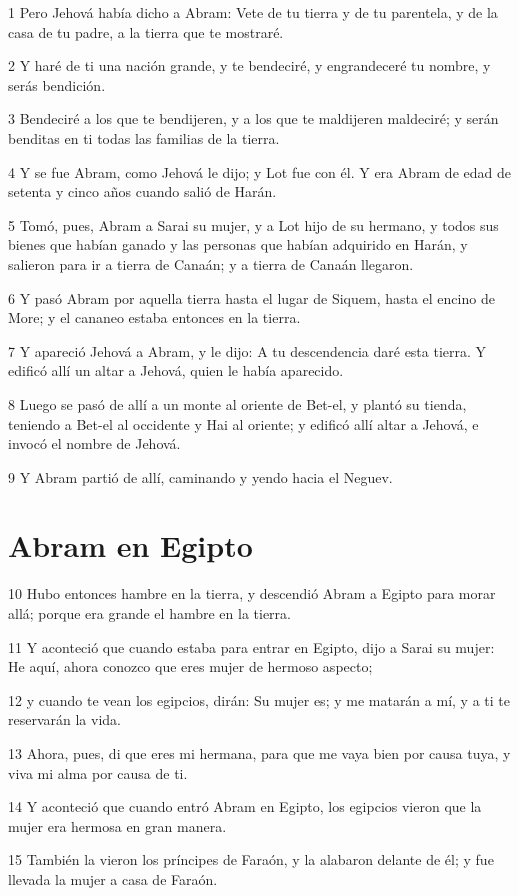 1 Pero Jehová había dicho a Abram: Vete de tu tierra y de tu parentela, y de la casa de tu padre, a la tierra que te mostraré.

2 Y haré de ti una nación grande, y te bendeciré, y engrandeceré tu nombre, y serás bendición.

3 Bendeciré a los que te bendijeren, y a los que te maldijeren maldeciré; y serán benditas en ti todas las familias de la tierra.

4 Y se fue Abram, como Jehová le dijo; y Lot fue con él. Y era Abram de edad de setenta y cinco años cuando salió de Harán.

5 Tomó, pues, Abram a Sarai su mujer, y a Lot hijo de su hermano, y todos sus bienes que habían ganado y las personas que habían adquirido en Harán, y salieron para ir a tierra de Canaán; y a tierra de Canaán llegaron.

6 Y pasó Abram por aquella tierra hasta el lugar de Siquem, hasta el encino de More; y el cananeo estaba entonces en la tierra.

7 Y apareció Jehová a Abram, y le dijo: A tu descendencia daré esta tierra. Y edificó allí un altar a Jehová, quien le había aparecido.

8 Luego se pasó de allí a un monte al oriente de Bet-el, y plantó su tienda, teniendo a Bet-el al occidente y Hai al oriente; y edificó allí altar a Jehová, e invocó el nombre de Jehová.

9 Y Abram partió de allí, caminando y yendo hacia el Neguev.

\section{Abram en Egipto}

10 Hubo entonces hambre en la tierra, y descendió Abram a Egipto para morar allá; porque era grande el hambre en la tierra.

11 Y aconteció que cuando estaba para entrar en Egipto, dijo a Sarai su mujer: He aquí, ahora conozco que eres mujer de hermoso aspecto;

12 y cuando te vean los egipcios, dirán: Su mujer es; y me matarán a mí, y a ti te reservarán la vida.

13 Ahora, pues, di que eres mi hermana, para que me vaya bien por causa tuya, y viva mi alma por causa de ti.

14 Y aconteció que cuando entró Abram en Egipto, los egipcios vieron que la mujer era hermosa en gran manera.

15 También la vieron los príncipes de Faraón, y la alabaron delante de él; y fue llevada la mujer a casa de Faraón.

